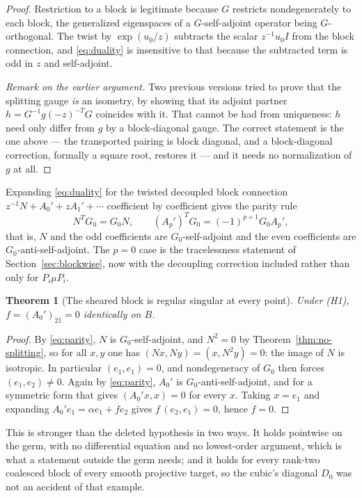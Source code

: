 \documentclass[11pt]{article}
\newtheorem{theorem}{Theorem}
\theoremstyle{definition}
\theoremstyle{remark}
\begin{document}
\begin{proof}
Restriction to a block is legitimate because $G$ restricts nondegenerately to
each block, the generalized eigenspaces of a $G$-self-adjoint operator being
$G$-orthogonal. The twist by $\exp(u_0/z)$ subtracts the scalar $z^{-1}u_0I$ from
the block connection, and \eqref{eq:duality} is insensitive to that because the
subtracted term is odd in $z$ and self-adjoint.

\emph{Remark on the earlier argument.} Two previous versions tried to prove that
the splitting gauge \emph{is} an isometry, by showing that its adjoint partner
$h=G^{-1}g(-z)^{-T}G$ coincides with it. That cannot be had from uniqueness: $h$
need only differ from $g$ by a block-diagonal gauge. The correct statement is the
one above --- the transported pairing is block diagonal, and a block-diagonal
correction, formally a square root, restores it --- and it needs no normalization
of $g$ at all.
\end{proof}

Expanding \eqref{eq:duality} for the twisted decoupled block connection
$z^{-1}N+A_0'+zA_1'+\cdots$ coefficient by coefficient gives the parity rule
\[
  N^TG_0=G_0N,
  \qquad
  (A_p')^TG_0=(-1)^{p+1}G_0A_p',
  \tag{8.5}
  \label{eq:parity}
\]
that is, $N$ and the odd coefficients are $G_0$-self-adjoint and the even
coefficients are $G_0$-anti-self-adjoint. The $p=0$ case is the tracelessness
statement of Section~\ref{sec:blockwise}, now with the decoupling correction
included rather than only for $P_i\mu P_i$.

\begin{theorem}[The sheared block is regular singular at every point]
\label{thm:h2-automatic}
Under (H1), $f=(A_0')_{21}=0$ identically on $B$.
\end{theorem}

\begin{proof}
By \eqref{eq:parity}, $N$ is $G_0$-self-adjoint, and $N^2=0$ by
Theorem~\ref{thm:no-splitting}, so for all $x,y$ one has
$(Nx,Ny)=(x,N^2y)=0$: the image of $N$ is isotropic. In particular
$(e_1,e_1)=0$, and nondegeneracy of $G_0$ then forces $(e_1,e_2)\ne0$. Again by
\eqref{eq:parity}, $A_0'$ is $G_0$-anti-self-adjoint, and for a symmetric form
that gives $(A_0'x,x)=0$ for every $x$. Taking $x=e_1$ and expanding
$A_0'e_1=\alpha e_1+fe_2$ gives $f\,(e_2,e_1)=0$, hence $f=0$.
\end{proof}

This is stronger than the deleted hypothesis in two ways. It holds pointwise on
the germ, with no differential equation and no lowest-order argument, which is
what a statement outside the germ needs; and it holds for every rank-two
coalesced block of every smooth projective target, so the cubic's diagonal
$D_0$ was not an accident of that example.
\end{document}
